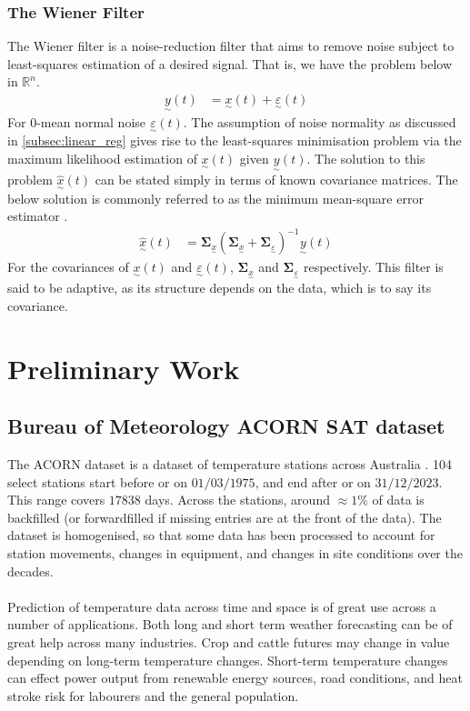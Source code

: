 \documentclass[12pt,a4paper]{article} %
\newcommand{\ve}[1]{\underset{\sim}{#1}}
\begin{document}
\subsubsection{The Wiener Filter}
\label{subsec:wiener}
The Wiener filter is a noise-reduction filter that aims to remove noise subject to least-squares estimation of a desired signal. That is, we have the problem below in $\mathbb{R}^n$.
\begin{align*}
    \ve{y}(t)&=\ve{x}(t)+\ve{\varepsilon}(t)
\end{align*}
For 0-mean normal noise $\ve{\varepsilon}(t)$. The assumption of noise normality as discussed in \ref{subsec:linear_reg} gives rise to the least-squares minimisation problem via the maximum likelihood estimation of $\ve{x}(t)$ given $\ve{y}(t)$. The solution to this problem $\hat{\ve{x}}(t)$ can be stated simply in terms of known covariance matrices. The below solution is commonly referred to as the minimum mean-square error estimator \cite{mmse}.
\begin{align*}
    \hat{\ve{x}}(t)&=\pmb{\Sigma}_{\ve{x}}(\pmb{\Sigma}_{\ve{x}}+\pmb{\Sigma}_{\ve{\varepsilon}})^{-1}\ve{y}(t)
\end{align*}
For the covariances of $\ve{x}(t)$ and $\ve{\varepsilon}(t)$, $\pmb{\Sigma}_{\ve{x}}$ and $\pmb{\Sigma}_{\ve{\varepsilon}}$ respectively. This filter is said to be adaptive, as its structure depends on the data, which is to say its covariance.


\newpage
\section{Preliminary Work}
\subsection{Bureau of Meteorology ACORN SAT dataset}
\label{subsec:BOM}
The ACORN dataset is a dataset of temperature stations across Australia \cite{bom}. 104 select stations start before or on $01/03/1975$, and end after or on $31/12/2023$. This range covers $17838$ days. Across the stations, around $\approx1\%$ of data is backfilled (or forwardfilled if missing entries are at the front of the data). The dataset is homogenised, so that some data has been processed to account for station movements, changes in equipment, and changes in site conditions over the decades.\\\\
Prediction of temperature data across time and space is of great use across a number of applications. Both long and short term weather forecasting can be of great help across many industries. Crop and cattle futures may change in value depending on long-term temperature changes. Short-term temperature changes can effect power output from renewable energy sources, road conditions, and heat stroke risk for labourers and the general population.
\end{document}
